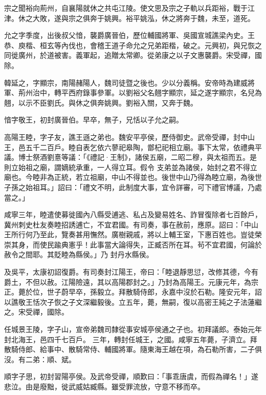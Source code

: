 \begin{pinyinscope}
 宗之聞裕向荊州，自襄陽就休之共屯江陵。使文思及宗之子軌以兵距裕，戰于江津。休之大敗，遂與宗之俱奔于姚興。裕平姚泓，休之將奔于魏，未至，道死。



 允之字季度，出後叔父愔，襲爵廣晉伯，歷位輔國將軍、吳國宣城譙梁內史。王恭、庾楷、桓玄等內伐也，會稽王道子命允之兄弟距楷，破之。元興初，與兄恢之同徙廣州，於道被害。義軍起，追贈太常卿。從弟康之以子文惠襲爵。宋受禪，國除。



 韓延之，字顯宗，南陽赭陽人，魏司徒暨之後也。少以分義稱。安帝時為建威將軍、荊州治中，轉平西府錄事參軍。以劉裕父名翹字顯宗，延之遂字顯宗，名兒為翹，以示不臣劉氏。與休之俱奔姚興。劉裕入關，又奔于魏。



 愔字敬王，初封廣晉伯。早卒，無子，兄恬以子允之嗣。



 高陽王睦，字子友，譙王遜之弟也。魏安平亭侯，歷侍御史。武帝受禪，封中山王，邑五千二百戶。睦自表乞依六蓼祀皋陶，鄫杞祀相立廟。事下太常，依禮典平議。博士祭酒劉憙等議：「《禮記·王制》，諸侯五廟，二昭二穆，與太祖而五。是則立始祖之廟，謂嫡統承重，一人得立耳。假令
 支弟並為諸侯，始封之君不得立廟也。今睦非為正統，若立祖廟，中山不得並也。後世中山乃得為睦立廟，為後世子孫之始祖耳。」詔曰：「禮文不明，此制度大事，宜令詳審，可下禮官博議，乃處當之。」



 咸寧三年，睦遣使募徙國內八縣受逋逃、私占及變易姓名、詐冒復除者七百餘戶，冀州刺史杜友奏睦招誘逋亡，不宜君國。有司奏，事在赦前，應原。詔曰：「中山王所行何乃至此，覽奏甚用憮然。廣樹親戚，將以上輔王室，下惠百姓也。豈徒榮崇其身，而使民踰典憲乎！此事當大論得失，正臧否所在耳。茍不宜君國，何論於赦令之間耶。其貶睦為縣侯。」乃
 封丹水縣侯。



 及吳平，太康初詔復爵。有司奏封江陽王，帝曰：「睦退靜思愆，改修其德，今有爵土，不但以赦。江陽險遠，其以高陽郡封之。」乃封為高陽王。元康元年，為宗正。薨於位，世子蔚早卒，孫毅立。拜散騎侍郎，永嘉中沒於石勒。隆安元年，詔以譙敬王恬次子恢之子文深繼毅後。立五年，薨，無嗣，復以高密王純之子法蓮繼之。宋受禪，國除。



 任城景王陵，字子山，宣帝弟魏司隸從事安城亭侯通之子也。初拜議郎。泰始元年封北海王，邑四千七百戶。
 三年，轉封任城王，之國。咸寧五年薨，子濟立。拜散騎侍郎、給事中、散騎常侍、輔國將軍。隨東海王越在項，為石勒所害，二子俱沒。有二弟：順、斌。



 順字子思，初封習陽亭侯。及武帝受禪，順歎曰：「事乖唐虞，而假為禪名！」遂悲泣。由是廢黜，徙武威姑臧縣。雖受罪流放，守意不移而卒。




\end{pinyinscope}

